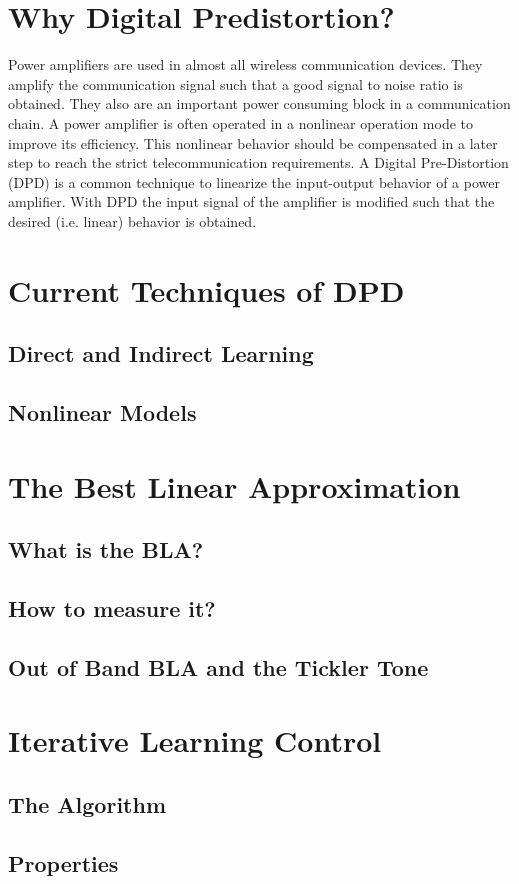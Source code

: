\section{Why Digital Predistortion?}
	
	Power amplifiers are used in almost all wireless communication devices. They amplify the communication signal such that a good signal to noise ratio is obtained. They also are an important power consuming block in a communication chain. A power amplifier is often operated in a nonlinear operation mode to improve its efficiency. This nonlinear behavior should be compensated in a later step to reach the strict telecommunication requirements.
	A Digital Pre-Distortion (DPD) is a common technique to linearize the input-output behavior of a power amplifier. With DPD the input signal of the amplifier is modified such that the desired (i.e. linear) behavior is obtained. 

\section{Current Techniques of DPD}
	\subsection{Direct and Indirect Learning}
	\subsection{Nonlinear Models}
\section{The Best Linear Approximation}
	\subsection{What is the BLA?}
	\subsection{How to measure it?}
	\subsection{Out of Band BLA and the Tickler Tone}

\section{Iterative Learning Control}
	\subsection{The Algorithm}
	\subsection{Properties}